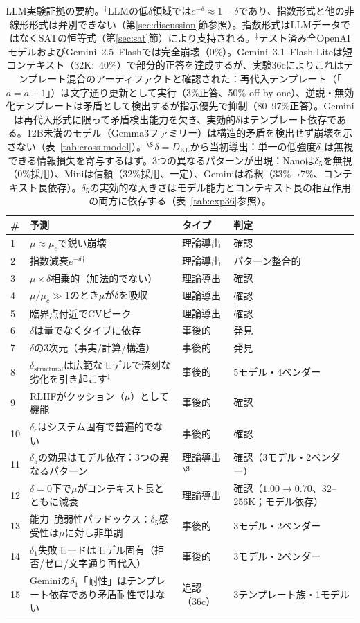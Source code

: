 \documentclass[11pt,a4paper]{article}
\begin{document}
\begin{table}[htbp]
\centering
\small
\begin{tabular}{llll}
\toprule
\textbf{\#} & \textbf{予測} & \textbf{タイプ} & \textbf{判定} \\
\midrule
1 & $\mu \approx \mu_c$で鋭い崩壊 & 理論導出 & 確認 \\
2 & 指数減衰$e^{-\delta}$$^\dagger$ & 理論導出 & パターン整合的 \\
3 & $\mu \times \delta$相乗的（加法的でない） & 理論導出 & 確認 \\
4 & $\mu/\mu_c \gg 1$のとき$\mu$が$\delta$を吸収 & 理論導出 & 確認 \\
5 & 臨界点付近でCVピーク & 理論導出 & 確認 \\
\midrule
6 & $\delta$は量でなくタイプに依存 & 事後的 & 発見 \\
7 & $\delta$の3次元（事実/計算/構造） & 事後的 & 発見 \\
8 & $\delta_{\text{structural}}$は広範なモデルで深刻な劣化を引き起こす$^\ddagger$ & 事後的 & 5モデル・4ベンダー \\
9 & RLHFがクッション（$\mu$）として機能 & 事後的 & 確認 \\
10 & $\delta_c$はシステム固有で普遍的でない & 事後的 & 確認 \\
\midrule
11 & $\delta_5$の効果はモデル依存：3つの異なるパターン & 理論導出$^\S$ & 確認（3モデル・2ベンダー） \\
12 & $\delta = 0$下で$\mu$がコンテキスト長とともに減衰 & 理論導出 & 確認（$1.00 \to 0.70$、32--256K；モデル依存） \\
13 & 能力--脆弱性パラドックス：$\delta_5$感受性は$\mu$に対し非単調 & 事後的 & 3モデル・2ベンダー \\
14 & $\delta_1$失敗モードはモデル固有（拒否/ゼロ/文字通り再代入） & 事後的 & 3モデル・2ベンダー \\
15 & Geminiの$\delta_1$「耐性」はテンプレート依存であり矛盾耐性ではない & 追認（36c） & 3テンプレート族・1モデル \\
\bottomrule
\end{tabular}
\caption{LLM実験証拠の要約。$^\dagger$LLMの低$\delta$領域では$e^{-\delta} \approx 1 - \delta$であり、指数形式と他の非線形形式は弁別できない（第\ref{sec:discussion}節参照）。指数形式はLLMデータではなくSATの恒等式（第\ref{sec:sat}節）により支持される。$^\ddagger$テスト済み全OpenAIモデルおよびGemini~2.5~Flashでは完全崩壊（$0\%$）。Gemini~3.1~Flash-Liteは短コンテキスト（32K:~40\%）で部分的正答を達成するが、実験36cによりこれはテンプレート混合のアーティファクトと確認された：再代入テンプレート（「$a = a + 1$」）は文字通り更新として実行（3\%正答、50\% off-by-one）、逆説・無効化テンプレートは矛盾として検出するが指示優先で抑制（80--97\%正答）。Geminiは再代入形式に限って矛盾検出能力を欠き、実効的$\delta$はテンプレート依存である。12B未満のモデル（Gemma3ファミリー）は構造的矛盾を検出せず崩壊を示さない（表~\ref{tab:cross-model}）。$^\S$$\delta = D_{\text{KL}}$から当初導出：単一の低強度$\delta_5$は無視できる情報損失を寄与するはず。3つの異なるパターンが出現：Nanoは$\delta_5$を無視（0\%採用）、Miniは信頼（32\%採用、一定）、Geminiは希釈（33\%→7\%、コンテキスト長依存）。$\delta_5$の実効的な大きさはモデル能力とコンテキスト長の相互作用の両方に依存する（表~\ref{tab:exp36}参照）。}

\end{table}
\end{document}
